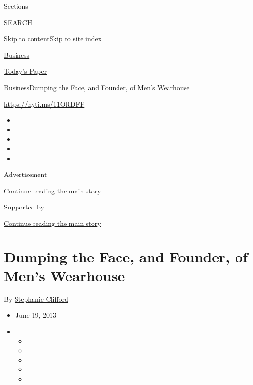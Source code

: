Sections

SEARCH

\protect\hyperlink{site-content}{Skip to
content}\protect\hyperlink{site-index}{Skip to site index}

\href{https://www.nytimes3xbfgragh.onion/section/business}{Business}

\href{https://myaccount.nytimes3xbfgragh.onion/auth/login?response_type=cookie\&client_id=vi}{}

\href{https://www.nytimes3xbfgragh.onion/section/todayspaper}{Today's
Paper}

\href{/section/business}{Business}\textbar{}Dumping the Face, and
Founder, of Men's Wearhouse

\href{https://nyti.ms/11ORDFP}{https://nyti.ms/11ORDFP}

\begin{itemize}
\item
\item
\item
\item
\item
\end{itemize}

Advertisement

\protect\hyperlink{after-top}{Continue reading the main story}

Supported by

\protect\hyperlink{after-sponsor}{Continue reading the main story}

\hypertarget{dumping-the-face-and-founder-of-mens-wearhouse}{%
\section{Dumping the Face, and Founder, of Men's
Wearhouse}\label{dumping-the-face-and-founder-of-mens-wearhouse}}

By
\href{https://www.nytimes3xbfgragh.onion/by/stephanie-clifford}{Stephanie
Clifford}

\begin{itemize}
\item
  June 19, 2013
\item
  \begin{itemize}
  \item
  \item
  \item
  \item
  \item
  \end{itemize}
\end{itemize}


